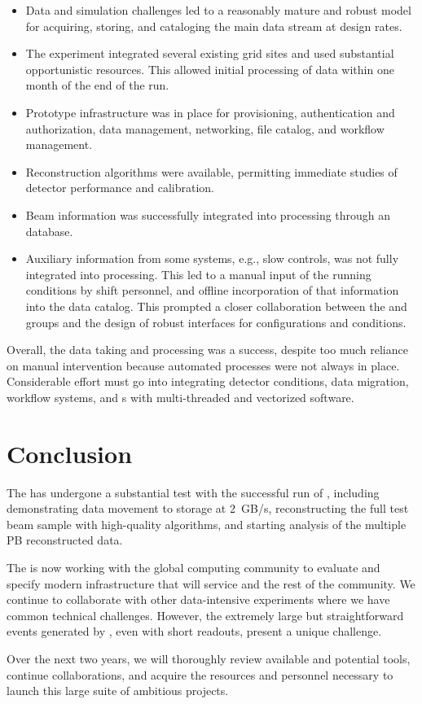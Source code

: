 \begin{itemize}
    \item Data and simulation challenges led to a reasonably mature and robust model for acquiring, storing, and cataloging the main data stream at design rates.
    \item The experiment integrated several existing grid sites and used substantial opportunistic resources.  This allowed initial processing of data within one month of the end of the run.
    \item Prototype infrastructure was in place for provisioning, authentication and authorization, data management, networking, file catalog, and workflow management. 
    \item Reconstruction algorithms were available, permitting immediate studies of detector performance and calibration. 
    \item Beam information was successfully integrated into processing through %
    an  database.
    \item Auxiliary information from some systems, e.g., slow controls, was not fully integrated into processing. This led to a manual input of the running conditions by shift personnel, and offline incorporation of that information into the data catalog. This prompted a closer collaboration between the  and  groups and the design of robust interfaces for configurations and conditions. 
\end{itemize}

Overall, the  data taking and processing was a success, despite too much reliance on manual intervention %
because  automated processes were not always in place. 
Considerable effort must go into integrating detector conditions, data migration, workflow systems, and s with multi-threaded and vectorized software.






\section{Conclusion}
The   has undergone a substantial test with the successful run of , including demonstrating data movement to storage at \SI{2}{GB/s}, reconstructing the full test beam sample with high-quality algorithms, and starting analysis of the multiple PB reconstructed data. 

The  is now working with the global  computing community to evaluate and specify modern infrastructure that will service  and the rest of the  community.  We continue to collaborate with other data-intensive experiments where we have common technical challenges. However, the extremely large but straightforward events generated by  , even with short readouts, present a unique challenge. 

Over the next two years, we  will thoroughly review available and potential tools, continue collaborations, and acquire the resources and personnel necessary to launch this large suite of ambitious projects. 
